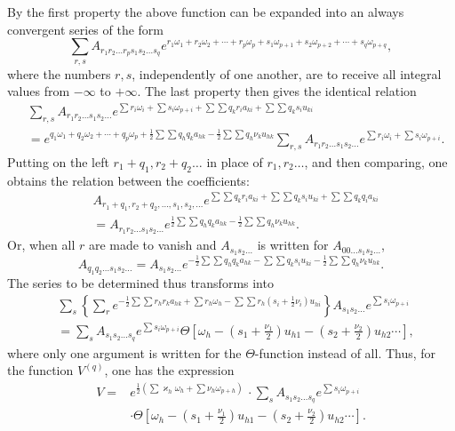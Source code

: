 \documentclass[10pt]{article}
\begin{document}
By the first property the above function can be expanded into an always convergent series of the form
\[
\sum_{r,s} A_{r_1r_2\ldots r_ps_1s_2\ldots s_q}
 e^{r_1\omega_1+r_2\omega_2+\cdots+r_p\omega_p+s_1\omega_{p+1}+s_2\omega_{p+2}+\cdots+s_q\omega_{p+q}},
\]
where the numbers \(r,s\), independently of one another, are to receive all integral values from \(-\infty\) to \(+\infty\). The last property then gives the identical relation
\[
\begin{aligned}
&\sum_{r,s} A_{r_1r_2\ldots s_1s_2\ldots}
 e^{\sum r_i\omega_i+\sum s_i\omega_{p+i}+\sum\sum q_kr_ia_{ki}+\sum\sum q_ks_iu_{ki}}\\
&=e^{q_1\omega_1+q_2\omega_2+\cdots+q_p\omega_p+\frac12\sum\sum q_hq_ka_{hk}-\frac12\sum\sum q_h\nu_ku_{hk}}
\sum_{r,s} A_{r_1r_2\ldots s_1s_2\ldots}e^{\sum r_i\omega_i+\sum s_i\omega_{p+i}}.
\end{aligned}
\]
Putting on the left \(r_1+q_1,r_2+q_2\ldots\) in place of \(r_1,r_2\ldots\), and then comparing, one obtains the relation between the coefficients:
\[
\begin{aligned}
&A_{r_1+q_1,r_2+q_2,\ldots,s_1,s_2,\ldots}
 e^{\sum\sum q_kr_ia_{ki}+\sum\sum q_ks_iu_{ki}+\sum\sum q_kq_ia_{ki}}\\
&=A_{r_1r_2\ldots s_1s_2\ldots}
 e^{\frac12\sum\sum q_hq_ka_{hk}-\frac12\sum\sum q_h\nu_ku_{hk}}.
\end{aligned}
\]
Or, when all \(r\) are made to vanish and \(A_{s_1s_2\ldots}\) is written for \(A_{00\ldots s_1s_2\ldots}\),
\[
A_{q_1q_2\ldots s_1s_2\ldots}=A_{s_1s_2\ldots}
 e^{-\frac12\sum\sum q_hq_ka_{hk}-\sum\sum q_ks_iu_{ki}-\frac12\sum\sum q_h\nu_ku_{hk}}.
\]
The series to be determined thus transforms into
\[
\begin{aligned}
&\sum_s\left\{\sum_r e^{-\frac12\sum\sum r_hr_ka_{hk}+\sum r_h\omega_h-
\sum\sum r_h\left(s_i+\frac12\nu_i\right)u_{hi}}\right\}
 A_{s_1s_2\ldots}e^{\sum s_i\omega_{p+i}}\\
&=\sum_s A_{s_1s_2\ldots s_q}e^{\sum s_i\omega_{p+i}}
 \Theta\left[\omega_h-\left(s_1+\frac{\nu_1}{2}\right)u_{h1}-\left(s_2+\frac{\nu_2}{2}\right)u_{h2}\cdots\right],
\end{aligned}
\]
where only one argument is written for the \(\Theta\)-function instead of all. Thus, for the function \(V^{(q)}\), one has the expression
\[
\begin{aligned}
V={}&e^{\frac12(\sum\varkappa_h\omega_h+\sum\nu_h\omega_{p+h})}\,\cdot
\sum_s A_{s_1s_2\ldots s_q}e^{\sum s_i\omega_{p+i}}\\
&\cdot\Theta\left[\omega_h-\left(s_1+\frac{\nu_1}{2}\right)u_{h1}-\left(s_2+\frac{\nu_2}{2}\right)u_{h2}\cdots\right].
\end{aligned}
\]
\end{document}

